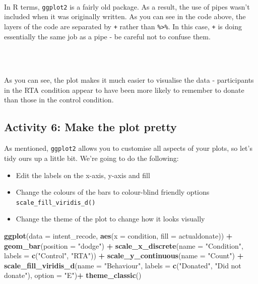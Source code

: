 \documentclass[]{book}
\newenvironment{Shaded}{\begin{snugshade}}{\end{snugshade}}
\newcommand{\DataTypeTok}[1]{\textcolor[rgb]{0.13,0.29,0.53}{#1}}
\newcommand{\KeywordTok}[1]{\textcolor[rgb]{0.13,0.29,0.53}{\textbf{#1}}}
\newcommand{\NormalTok}[1]{#1}
\newcommand{\OperatorTok}[1]{\textcolor[rgb]{0.81,0.36,0.00}{\textbf{#1}}}
\newcommand{\StringTok}[1]{\textcolor[rgb]{0.31,0.60,0.02}{#1}}
\providecommand{\tightlist}{%
  \setlength{\itemsep}{0pt}\setlength{\parskip}{0pt}}
\newenvironment{warning}
    {
    \hline\\
    }
    { 
    \\\\\hline
    }
\begin{document}
\begin{warning}
In R terms, \texttt{ggplot2} is a fairly old package. As a result, the
use of pipes wasn't included when it was originally written. As you can
see in the code above, the layers of the code are separated by
\texttt{+} rather than \texttt{\%\textgreater{}\%}. In this case,
\texttt{+} is doing essentially the same job as a pipe - be careful not
to confuse them.
\end{warning}

As you can see, the plot makes it much easier to visualise the data - participants in the RTA condition appear to have been more likely to remember to donate than those in the control condition.

\hypertarget{activity-6-make-the-plot-pretty}{%
\subsection{Activity 6: Make the plot pretty}\label{activity-6-make-the-plot-pretty}}

As mentioned, \texttt{ggplot2} allows you to customise all aspects of your plots, so let's tidy ours up a little bit. We're going to do the following:

\begin{itemize}
\tightlist
\item
  Edit the labels on the x-axis, y-axis and fill\\
\item
  Change the colours of the bars to colour-blind friendly options \texttt{scale\_fill\_viridis\_d()}\\
\item
  Change the theme of the plot to change how it looks visually
\end{itemize}

\begin{Shaded}
\begin{Highlighting}[]
\KeywordTok{ggplot}\NormalTok{(}\DataTypeTok{data =}\NormalTok{ intent_recode, }\KeywordTok{aes}\NormalTok{(}\DataTypeTok{x =}\NormalTok{ condition, }\DataTypeTok{fill =}\NormalTok{ actualdonate)) }\OperatorTok{+}
\StringTok{  }\KeywordTok{geom_bar}\NormalTok{(}\DataTypeTok{position =} \StringTok{"dodge"}\NormalTok{) }\OperatorTok{+}
\StringTok{  }\KeywordTok{scale_x_discrete}\NormalTok{(}\DataTypeTok{name =} \StringTok{"Condition"}\NormalTok{, }\DataTypeTok{labels =} \KeywordTok{c}\NormalTok{(}\StringTok{"Control"}\NormalTok{, }\StringTok{"RTA"}\NormalTok{)) }\OperatorTok{+}
\StringTok{  }\KeywordTok{scale_y_continuous}\NormalTok{(}\DataTypeTok{name =} \StringTok{"Count"}\NormalTok{) }\OperatorTok{+}
\StringTok{  }\KeywordTok{scale_fill_viridis_d}\NormalTok{(}\DataTypeTok{name =} \StringTok{"Behaviour"}\NormalTok{, }\DataTypeTok{labels =} \KeywordTok{c}\NormalTok{(}\StringTok{"Donated"}\NormalTok{, }\StringTok{"Did not donate"}\NormalTok{), }\DataTypeTok{option =} \StringTok{"E"}\NormalTok{)}\OperatorTok{+}
\StringTok{  }\KeywordTok{theme_classic}\NormalTok{()}
\end{Highlighting}
\end{Shaded}
\end{document}
